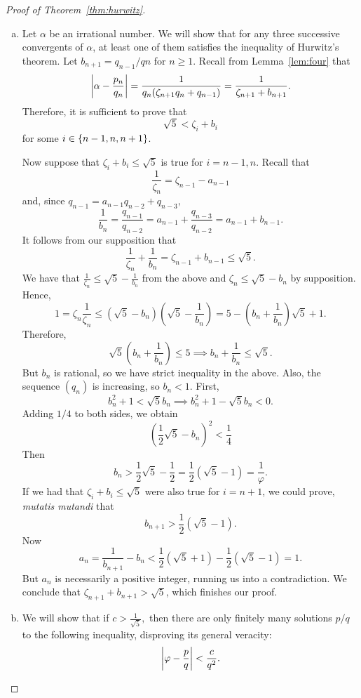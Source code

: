 \documentclass[12pt, letterpaper, oneside]{book}
\newcommand{\ga}{\ensuremath{\alpha}}
\newcommand{\gf}{\ensuremath{\varphi}}
\newcommand{\gz}{\ensuremath{\zeta}}
\DeclarePairedDelimiter{\abs}{\lvert}{\rvert}
\DeclarePairedDelimiter{\set}{\lbrace}{\rbrace}
\theoremstyle{plain}
\theoremstyle{definition}
\theoremstyle{remark}
\begin{document}
  \begin{proof}[Proof of Theorem~\ref{thm:hurwitz}]
  ~
  \begin{enumerate}[(a)]
  \item Let $\ga$ be an irrational number. We will show that for any three successive convergents of $\ga$, at least one of them satisfies the inequality of Hurwitz's theorem.
  Let $b_{n+1} = q_{n-1}/q{n}$ for $n\geq 1$. Recall from Lemma~\ref{lem:four} that 
  \[
  \abs*{\ga - \frac{p_n}{q_n}} = \frac{1}{q_n(\gz_{n+1}q_n+q_{n-1})} = \frac{1}{\gz_{n+1} + b_{n+1}}.
  \]
  Therefore, it is sufficient to prove that 
  \[
 \sqrt{5} < \gz_i + b_i 
  \]
 for some $i \in \set{n-1,n,n+1}$.
  
  Now suppose that $ \gz_i + b_i \leq \sqrt{5}$ is true for $i = n-1,n$. Recall that
  \[
  \frac{1}{\gz_n} = \gz_{n-1} - a_{n-1} 
  \]
  and, since $q_{n-1} = a_{n-1}q_{n-2} + q_{n-3},$
  \[
  \frac{1}{b_n} = \frac{q_{n-1}}{q_{n-2}} = a_{n-1} + \frac{q_{n-3}}{q_{n-2}} = a_{n-1} + b_{n-1}.
  \]
  It follows from our supposition that
  \[
  \frac{1}{\gz_n} + \frac{1}{b_n} = \gz_{n-1} + b_{n-1} \leq \sqrt{5}.
  \]
  We have that $\frac{1}{\gz_n} \leq \sqrt{5} - \frac{1}{b_n}$ from the above and $\gz_n \leq \sqrt{5} - b_n$ by supposition. Hence,
  \[
  1 = \gz_n\frac{1}{\gz_n} \leq (\sqrt{5} - b_n)(\sqrt{5} - \frac{1}{b_n}) = 5 - (b_n + \frac{1}{b_n})\sqrt{5} + 1.
  \]
  Therefore, 
  \[
  \sqrt{5}(b_n + \frac{1}{b_n}) \leq 5 \implies b_n + \frac{1}{b_n} \leq  \sqrt{5}. 
  \]
  But $b_n$ is rational, so we have strict inequality in the above. Also, the sequence $(q_n)$ is increasing, so $b_n < 1$.
 First,
 \[
  b_n^2 + 1 < \sqrt{5}b_n \implies b_n^2 + 1 - \sqrt{5}b_n < 0.
  \]
Adding $1/4$ to both sides, we obtain
  \[
  (\frac{1}{2}\sqrt{5} - b_n)^2 < \frac{1}{4}
  \]
  Then
  \[
   b_n > \frac{1}{2}\sqrt{5} - \frac{1}{2} = \frac{1}{2}(\sqrt{5} - 1) = \frac{1}{\gf}. 
  \]
  If we had that $\gz_i + b_i \leq \sqrt{5}$ were also true for $i = n+1$, we could prove, \textit{mutatis mutandi} that 
  \[
  b_{n+1} > \frac{1}{2}(\sqrt{5} - 1).
  \]
  Now 
  \[
  a_n = \frac{1}{b_{n+1}} - b_n < \frac{1}{2}(\sqrt{5} +1) - \frac{1}{2}(\sqrt{5} -1) = 1.
  \]
  But $a_n$ is necessarily a positive integer, running us into a contradiction. We conclude that $\gz_{n+1} + b_{n+1} > \sqrt{5}$, which finishes our proof.
  \item We will show that  if $c > \frac{1}{\sqrt{5}},$ then there are only finitely many solutions $p/q$ to the following inequality, disproving its general veracity: 
  \[
  \abs*{\gf - \frac{p}{q}} < \frac{c}{q^2}.
\]
\end{enumerate}
\end{proof}
\end{document}
